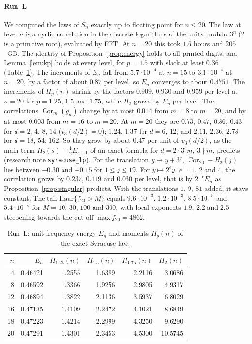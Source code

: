 \documentclass[12pt]{amsart}
\theoremstyle{definition}
\theoremstyle{remark}
\begin{document}
\paragraph{Run~L} We computed the laws of $S_n$ exactly up to floating point for $n\le20$. The law at level $n$ is a cyclic correlation in the discrete logarithms of the units modulo $3^n$ ($2$ is a primitive root), evaluated by FFT. At $n=20$ this took $1.6$ hours and $205$~GB. The identity of Proposition~\ref{prop:energy} holds to all printed digits, and Lemma~\ref{lem:kp} holds at every level, for $p=1.5$ with slack at least $0.36$ (Table~\ref{table:syr-moments}). The increments of $E_n$ fall from $5.7\cdot10^{-4}$ at $n=15$ to $3.1\cdot10^{-4}$ at $n=20$, by a factor of about $0.87$ per level, so $E_n$ converges to about $0.4751$. The increments of $H_p(n)$ shrink by the factors $0.909$, $0.930$ and $0.959$ per level at $n=20$ for $p=1.25$, $1.5$ and $1.75$, while $H_2$ grows by $E_n$ per level. The correlations $\operatorname{Cor}_m(g_d)$ change by at most $0.014$ from $m=8$ to $m=20$, and by at most $0.003$ from $m=16$ to $m=20$. At $m=20$ they are $0.73$, $0.47$, $0.86$, $0.43$ for $d=2$, $4$, $8$, $14$ ($v_3(d/2)=0$); $1.24$, $1.37$ for $d=6$, $12$; and $2.11$, $2.36$, $2.78$ for $d=18$, $54$, $162$. So they grow by about $0.47$ per unit of $v_3(d/2)$, as the main term $H_2(s)-\frac12E_{s+1}$ of an exact formula for $d=2\cdot3^sm$, $3\nmid m$, predicts (research note \texttt{syracuse\_lp}). For the translation $y\mapsto y+3^j$, $\operatorname{Cor}_{20}-H_2(j)$ lies between $-0.30$ and $-0.15$ for $1\le j\le19$. For $y\mapsto2^ey$, $e=1$, $2$ and $4$, the correlation grows by $0.237$, $0.119$ and $0.030$ per level, that is by $2^{-e}E_n$ as Proposition~\ref{prop:singular} predicts. With the translations $1$, $9$, $81$ added, it stays constant. The tail $\mathrm{Haar}\{f_{20}>M\}$ equals $9.6\cdot10^{-3}$, $1.2\cdot10^{-3}$, $8.5\cdot10^{-5}$ and $5.4\cdot10^{-6}$ for $M=10$, $30$, $100$ and $300$, with local exponents $1.9$, $2.2$ and $2.5$ steepening towards the cut-off $\max f_{20}=4862$.

\begin{table}[tp]
\centering
\small
\begin{tabular}{@{}rrrrrr@{}}
\toprule
$n$ & $E_n$ & $H_{1.25}(n)$ & $H_{1.5}(n)$ & $H_{1.75}(n)$ & $H_2(n)$\\
\midrule
4 & 0.46421 & 1.2555 & 1.6389 & 2.2116 & 3.0686\\
8 & 0.46592 & 1.3366 & 1.9256 & 2.9805 & 4.9317\\
12 & 0.46894 & 1.3822 & 2.1136 & 3.5937 & 6.8029\\
16 & 0.47135 & 1.4109 & 2.2472 & 4.1021 & 8.6849\\
18 & 0.47223 & 1.4214 & 2.2999 & 4.3250 & 9.6290\\
20 & 0.47291 & 1.4301 & 2.3453 & 4.5300 & 10.5745\\
\bottomrule
\end{tabular}
\caption{Run~L: unit-frequency energy $E_n$ and moments $H_p(n)$ of the exact Syracuse law.}
\label{table:syr-moments}
\end{table}
\end{document}
